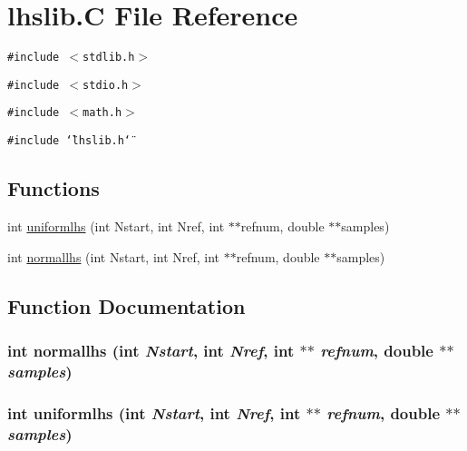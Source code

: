 \hypertarget{lhslib_8C}{
\section{lhslib.C File Reference}
\label{lhslib_8C}
}
{\tt \#include $<$stdlib.h$>$}\par
{\tt \#include $<$stdio.h$>$}\par
{\tt \#include $<$math.h$>$}\par
{\tt \#include \char`\"{}lhslib.h\char`\"{}}\par
\subsection*{Functions}
\begin{CompactItemize}
\item 
int \hyperlink{lhslib_8C_a0}{uniformlhs} (int Nstart, int Nref, int $\ast$$\ast$refnum, double $\ast$$\ast$samples)
\item 
int \hyperlink{lhslib_8C_a1}{normallhs} (int Nstart, int Nref, int $\ast$$\ast$refnum, double $\ast$$\ast$samples)
\end{CompactItemize}


\subsection{Function Documentation}
\hypertarget{lhslib_8C_a1}{
\subsubsection[normallhs]{\setlength{\rightskip}{0pt plus 5cm}int normallhs (int {\em Nstart}, int {\em Nref}, int $\ast$$\ast$ {\em refnum}, double $\ast$$\ast$ {\em samples})}}
\label{lhslib_8C_a1}


\hypertarget{lhslib_8C_a0}{
\subsubsection[uniformlhs]{\setlength{\rightskip}{0pt plus 5cm}int uniformlhs (int {\em Nstart}, int {\em Nref}, int $\ast$$\ast$ {\em refnum}, double $\ast$$\ast$ {\em samples})}}
\label{lhslib_8C_a0}


